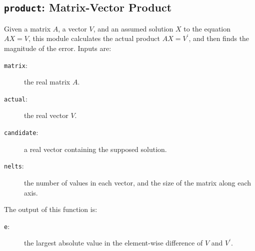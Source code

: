 \subsection{{\tt{product}}:
	Matrix-Vector Product
	\label{s:toys-product}}

Given a matrix $A$,
a vector $V$,
and an assumed solution $X$ to the equation $AX=V$,
this module calculates the actual product $AX={V^{\prime}}$,
and then finds the magnitude of the error.
Inputs are:
\begin{description}
\item[{\tt{matrix}}:]
	the real matrix $A$.
\item[{\tt{actual}}:]
	the real vector $V$.
\item[{\tt{candidate}}:]
	a real vector containing the supposed solution.
\item[{\tt{nelts}}:]
	the number of values in each vector, and the size of the matrix along each axis.
\end{description}
The output of this function is:
\begin{description}
\item[{\tt{e}}:]
	the largest absolute value in the element-wise difference of $V$ and $V^{\prime}$.
\end{description}
